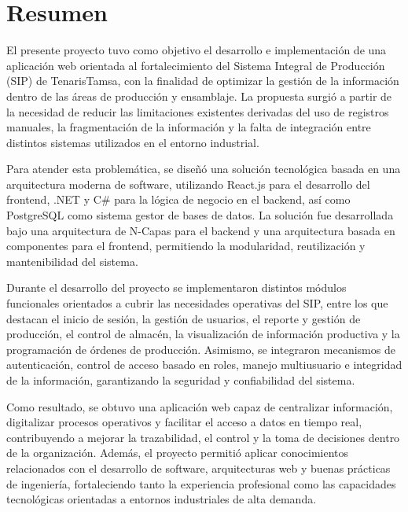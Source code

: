 \section*{Resumen}

El presente proyecto tuvo como objetivo el desarrollo e implementación de una aplicación web orientada al fortalecimiento del Sistema Integral de Producción (SIP) de TenarisTamsa, con la finalidad de optimizar la gestión de la información dentro de las áreas de producción y ensamblaje. La propuesta surgió a partir de la necesidad de reducir las limitaciones existentes derivadas del uso de registros manuales, la fragmentación de la información y la falta de integración entre distintos sistemas utilizados en el entorno industrial.


Para atender esta problemática, se diseñó una solución tecnológica basada en una arquitectura moderna de software, utilizando React.js para el desarrollo del frontend, .NET y C\# para la lógica de negocio en el backend, así como PostgreSQL como sistema gestor de bases de datos. La solución fue desarrollada bajo una arquitectura de N-Capas para el backend y una arquitectura basada en componentes para el frontend, permitiendo la modularidad, reutilización y mantenibilidad del sistema.


Durante el desarrollo del proyecto se implementaron distintos módulos funcionales orientados a cubrir las necesidades operativas del SIP, entre los que destacan el inicio de sesión, la gestión de usuarios, el reporte y gestión de producción, el control de almacén, la visualización de información productiva y la programación de órdenes de producción. Asimismo, se integraron mecanismos de autenticación, control de acceso basado en roles, manejo multiusuario e integridad de la información, garantizando la seguridad y confiabilidad del sistema.


Como resultado, se obtuvo una aplicación web capaz de centralizar información, digitalizar procesos operativos y facilitar el acceso a datos en tiempo real, contribuyendo a mejorar la trazabilidad, el control y la toma de decisiones dentro de la organización. Además, el proyecto permitió aplicar conocimientos relacionados con el desarrollo de software, arquitecturas web y buenas prácticas de ingeniería, fortaleciendo tanto la experiencia profesional como las capacidades tecnológicas orientadas a entornos industriales de alta demanda.
